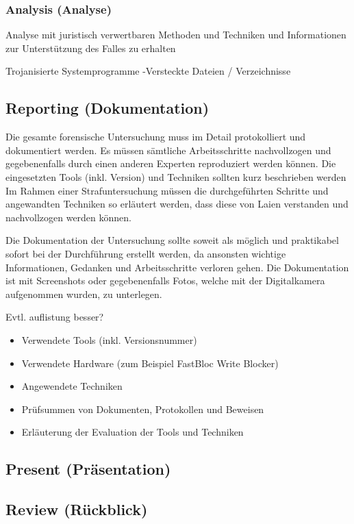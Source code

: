 \subsubsection{Analysis (Analyse)}
Analyse mit juristisch verwertbaren Methoden und Techniken und Informationen zur Unterstützung des Falles zu erhalten

Trojanisierte Systemprogramme
-Versteckte Dateien / Verzeichnisse

\subsection{Reporting (Dokumentation)}
Die gesamte forensische Untersuchung muss im Detail protokolliert und dokumentiert werden. Es müssen sämtliche Arbeitsschritte nachvollzogen und gegebenenfalls durch einen anderen Experten reproduziert werden können. Die eingesetzten Tools (inkl. Version) und Techniken sollten kurz beschrieben werden Im Rahmen einer Strafuntersuchung müssen die durchgeführten Schritte und angewandten Techniken so erläutert werden, dass diese von Laien verstanden und nachvollzogen werden können.

Die Dokumentation der Untersuchung sollte soweit als möglich und praktikabel sofort bei der Durchführung erstellt werden, da ansonsten wichtige Informationen, Gedanken und Arbeitsschritte verloren gehen. Die Dokumentation ist mit Screenshots oder gegebenenfalls Fotos, welche mit der Digitalkamera aufgenommen wurden, zu unterlegen.

Evtl. auflistung besser?
\begin{itemize}
\item Verwendete Tools (inkl. Versionsnummer)
\item Verwendete Hardware (zum Beispiel FastBloc Write Blocker)
\item Angewendete Techniken
\item Prüfsummen von Dokumenten, Protokollen und Beweisen
\item Erläuterung der Evaluation der Tools und Techniken
\end{itemize}
\subsection{Present (Präsentation)}


\subsection{Review (Rückblick)}

